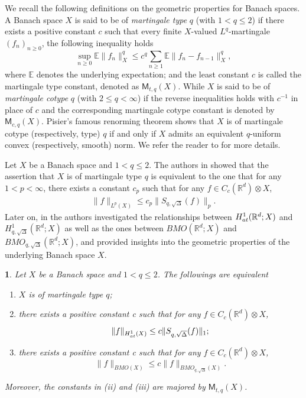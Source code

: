 \documentclass[oneside,english,a4wide]{amsart}
\numberwithin{equation}{section}
\numberwithin{figure}{section}
\theoremstyle{plain}
\newtheorem{thm}{\protect\theoremname}[section]
\theoremstyle{plain}
\theoremstyle{definition}
\theoremstyle{plain}
\theoremstyle{remark}
\theoremstyle{definition}
\theoremstyle{remark}
\theoremstyle{definition}
\providecommand{\theoremname}{Theorem}
\newcommand{\real}{{\mathbb R}}
\newcommand{\ce}{{\mathbb E}}
\newcommand{\8}{+\infty}
\renewcommand{\1}{\mathbbm{1}}
\newcommand\lk[1]{ \left\{ #1 \right\} }
\newcommand{\at}{{\rm at}}
\begin{document}
{We recall the following definitions on the geometric properties for Banach spaces. A Banach space $X$ is said to be of \emph{martingale type} $q$ (with $1<  q\leq2$) if there exists a positive constant $c$ such that every finite $X$-valued $L^q$-martingale $(f_n)_{n \geq 0}$, the following inequality holds
\[
   \sup_{n \geq 0} \ce\| f_n \|_X^q \leq c^q \sum_{ n \geq 1}\ce\| f_n - f_{n -1} \|_X^q,
\]
where $\ce$ denotes the underlying expectation; and the least constant $c$ is called the martingale type constant, denoted as $\mathsf{M}_{t, q}(X)$. While $X$ is said to be of \emph{martingale cotype} $q$ (with $2\leq q<\infty$) if the reverse inequalities holds with $c^{-1}$ in place of $c$ and the corresponding martingale cotype constant is denoted by $\mathsf{M}_{c, q}(X)$. Pisier's famous renorming theorem shows that $X$ is of martingale cotype (respectively, type) $q$ if and only if $X$ admits an equivalent $q$-uniform convex (respectively, smooth) norm. We refer the reader to \cite{Pi1975, Pi1986,Pisier2016martingales} for more details. 

Let $X$ be a Banach space and $1 < q \leq 2$. The authors in \cite{MTX} showed that the assertion that $X$ is of martingale type $q$ is equivalent to the one that for any $1<p<\infty$, there exists a constant $c_p$ such that for any $f \in C_c(\real^d)\otimes X$, 
        \begin{align}\label{MTXunoptimal}
            \| f \|_{L^p(X)} \leq c_p\| S_{q, \sqrt{\Delta}}(f) \|_p.
        \end{align}
        Later on, in \cite{Ouyang2010} the authors investigated the relationships between $H^1_{\at}(\real^d; X)$ and $H^1_{q, \sqrt{\Delta}}(\real^d; X)$ as well as the ones between $BMO(\real^d; X)$ and $BMO_{q, \sqrt{\Delta}}(\real^d; X)$, and provided insights into the geometric properties of the underlying Banach space $X$. 


\begin{thm}\label{thm:ouxu}
    Let $X$ be a Banach space and $1 < q \leq 2$. The followings are equivalent
    \begin{enumerate}[{\rm (i)}]
        \item $X$ is of martingale type $q$; 
        \item there exists a positive constant c such that for any $f \in C_c(\real^d)\otimes X$, 
        \[
            \| f \|_{H^1_\at(X)} \leq c\| S_{q, \sqrt{\Delta}}(f) \|_{1};
        \]
        \item there exists a positive constant c such that for any $f \in C_c(\real^d)\otimes X$, 
        \[
            \| f \|_{BMO(X)} \leq c\| f \|_{BMO_{q, \sqrt{\Delta}}(X)}.
        \]
    \end{enumerate}
    Moreover, the constants in {\rm (ii)} and {\rm (iii)} are majored by $\mathsf{M}_{t, q}(X)$.
\end{thm}

}
\end{document}
